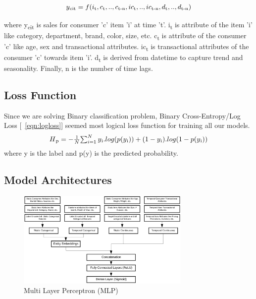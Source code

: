   \begin{equation}
    \begin{array}{l}
      y\textsubscript{cit}  = f(i\textsubscript{t}, c\textsubscript{t},..,c\textsubscript{t-n}, ic\textsubscript{t}
      ,..,ic\textsubscript{t-n}, d\textsubscript{t},..,d\textsubscript{t-n})
    \end{array}
    \label{eqn:fx}
  \end{equation}

where y\textsubscript{cit} is sales for consumer 'c' item ’i’ at time ’t’. 
i\textsubscript{t} is attribute of the item ’i’ like category, department, brand, color, size, etc. 
c\textsubscript{t} is attribute of the consumer 'c' like age, sex and transactional attributes. 
ic\textsubscript{t} is transactional attributes of the consumer 'c'  towards item 'i'. 
d\textsubscript{t} is derived from datetime to capture trend and seasonality. 
Finally, n is the number of time lags.

\subsection{Loss Function}
Since we are solving Binary classification problem, Binary Cross-Entropy/Log Loss [~\ref{eqn:logloss}] seemed most logical loss function 
for training all our models.
  \begin{equation}
      \begin{array}{l}
        H\textsubscript{p} = - \frac{1}{N}$$\sum_{i=1}^{N}y\textsubscript{i}.log(p(y\textsubscript{i}))+
        (1- y\textsubscript{i}).log(1-p(y\textsubscript{i}))
      \end{array}
    \label{eqn:logloss}
  \end{equation}
where y is the label and p(y) is the predicted probability.

\subsection{Model Architectures}

  \begin{figure}[t]
    \centering 
    \includegraphics[width=3.3in]{img/MLP.png} 
    \caption{Multi Layer Perceptron (MLP)} 
    \label{fig:MLP} 
  \end{figure}

